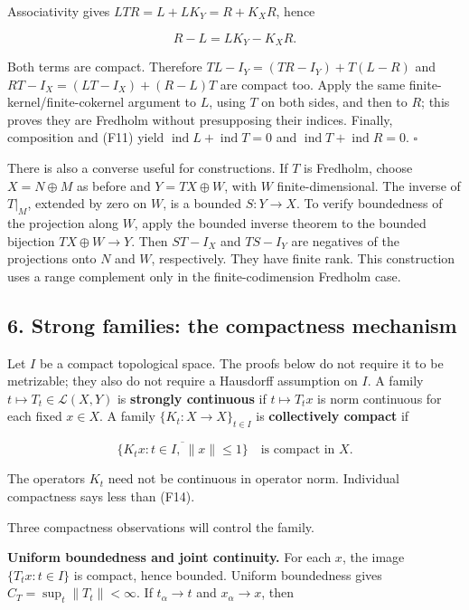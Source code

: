 \documentclass[
  11pt,
]{article}
\begin{document}
Associativity gives \(LTR=L+LK_Y=R+K_XR\), hence

\[
R-L=LK_Y-K_XR.                                                \tag{F13}
\]

Both terms are compact. Therefore \(TL-I_Y=(TR-I_Y)+T(L-R)\) and
\(RT-I_X=(LT-I_X)+(R-L)T\) are compact too. Apply the same
finite-kernel/finite-cokernel argument to \(L\), using \(T\) on both
sides, and then to \(R\); this proves they are Fredholm without
presupposing their indices. Finally, composition and (F11) yield
\(\operatorname{ind}L+\operatorname{ind}T=0\) and
\(\operatorname{ind}T+\operatorname{ind}R=0\). \(\square\)

There is also a converse useful for constructions. If \(T\) is Fredholm,
choose \(X=N\oplus M\) as before and \(Y=TX\oplus W\), with \(W\)
finite-dimensional. The inverse of \(T|_M\), extended by zero on \(W\),
is a bounded \(S:Y\to X\). To verify boundedness of the projection along
\(W\), apply the bounded inverse theorem to the bounded bijection
\(TX\oplus W\to Y\). Then \(ST-I_X\) and \(TS-I_Y\) are negatives of the
projections onto \(N\) and \(W\), respectively. They have finite rank.
This construction uses a range complement only in the finite-codimension
Fredholm case.

\subsection{6. Strong families: the compactness
mechanism}\label{strong-families-the-compactness-mechanism}

Let \(I\) be a compact topological space. The proofs below do not
require it to be metrizable; they also do not require a Hausdorff
assumption on \(I\). A family \(t\mapsto T_t\in\mathcal L(X,Y)\) is
\textbf{strongly continuous} if \(t\mapsto T_tx\) is norm continuous for
each fixed \(x\in X\). A family \(\{K_t:X\to X\}_{t\in I}\) is
\textbf{collectively compact} if

\[
\overline{\{K_tx:t\in I,\ \|x\|\leq1\}}\quad
\text{is compact in }X.                                      \tag{F14}
\]

The operators \(K_t\) need not be continuous in operator norm.
Individual compactness says less than (F14).

Three compactness observations will control the family.

\textbf{Uniform boundedness and joint continuity.} For each \(x\), the
image \(\{T_tx:t\in I\}\) is compact, hence bounded. Uniform boundedness
gives \(C_T=\sup_t\|T_t\|<\infty\). If \(t_\alpha\to t\) and
\(x_\alpha\to x\), then
\end{document}

